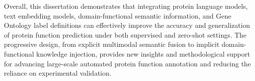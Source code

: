 \begin{eabstract}
Overall, this dissertation demonstrates that integrating protein language models, text embedding models, domain-functional semantic information, and Gene Ontology label definitions can effectively improve the accuracy and generalization of protein function prediction under both supervised and zero-shot settings. The progressive design, from explicit multimodal semantic fusion to implicit domain-functional knowledge injection, provides new insights and methodological support for advancing large-scale automated protein function annotation and reducing the reliance on experimental validation.

\end{eabstract}
